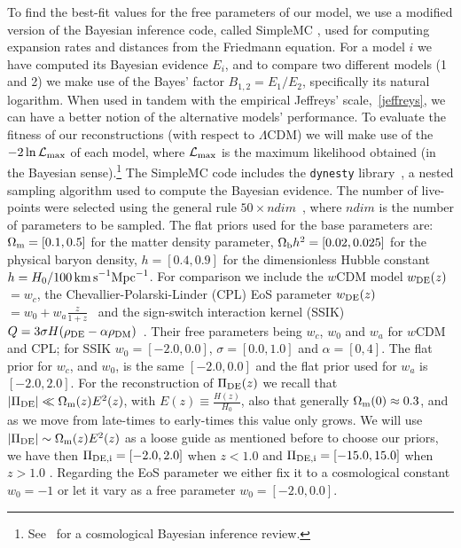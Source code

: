 \documentclass[twocolumn,a4paper,reprint,amssymb,aps,prd,groupedaddress,superscriptaddress,nofootinbib]{revtex4-2}
\newcommand{\wde}[1]{$w_{\rm DE}(z)$#1}
\begin{document}
To find the best-fit values for the free parameters of our model, we use a modified version of
the Bayesian inference code, called SimpleMC \cite{simplemc, aubourg2015cosmological}, used for
computing expansion rates
and distances from the Friedmann equation. For a model $i$ we have computed its Bayesian evidence $E_i$,
and to compare two different models (1 and 2) we make use of the Bayes' factor $B_{1,2} = E_1/E_2$,
specifically its natural logarithm. When used in tandem with the empirical Jeffreys' scale,~\cref{jeffreys},
we can have a better notion of the alternative models' performance. To evaluate the fitness of our
reconstructions (with respect to $\Lambda$CDM) we will make use of the $-2\ln \mathcal{L_{\rm max}}$
of each model, where $\mathcal{L_{\rm max}}$ is the maximum likelihood obtained (in the Bayesian sense).\footnote{See~\cite{Padilla:2019mgi} for a cosmological Bayesian inference review.}
The SimpleMC code includes the \texttt{dynesty} library~\cite{speagle2020dynesty},
a nested sampling algorithm used to compute the Bayesian evidence.  The number of live-points were
selected using the general rule $50 \times ndim$~\cite{dynestyy}, where $ndim$ is the number of parameters
to be sampled.
The flat priors used for the base parameters are: $\Omega_{\rm m} = [0.1, 0.5]$ for the matter
density parameter, $\Omega_{\rm b} h^2 = [0.02, 0.025]$ for the physical baryon density, $h = [0.4, 0.9]$
for the dimensionless Hubble constant $h=H_0/100\, {\rm km\,s}^{-1}{\rm Mpc}^{-1}$. For comparison we
include the $w$CDM model \wde{}$ = w_c$, the Chevallier-Polarski-Linder (CPL)
EoS parameter \wde{}$= w_0 + w_a\frac{z}{1+z}$~\cite{Chevallier} and the sign-switch interaction
kernel (SSIK) $Q=3\sigma H(\rho_{\rm DE}-\alpha\rho_{\rm DM})$~\cite{Sun:2010vz}. Their free parameters
being $w_c$, $w_0$ and $w_a$ for $w$CDM and CPL; for SSIK $w_0 = [-2.0, 0.0]$, $\sigma = [0.0, 1.0]$
and $\alpha= [0, 4]$.
%
The flat prior for $w_c$, and $w_0$, is the same $[-2.0,0.0]$ and the flat prior used for $w_a$ is
$[-2.0, 2.0]$. For the reconstruction of $\Pi_{\rm DE}(z)$ we recall that $|\Pi_{\rm DE} |
\ll \Omega_{\rm m}(z)E^2(z)$, with $E(z)\equiv \frac{H(z)}{H_0}$, also that generally $\Omega_{\rm m}(0)
\approx 0.3$, and as we move from late-times to early-times this value only grows.
We will use $|\Pi_{\rm DE}| \sim \Omega_{\rm m}(z)E^2(z)$ as a loose guide as mentioned before to choose our priors, we
have then $\Pi_{\rm DE,i} = [-2.0,2.0]$ when $z<1.0$ and $\Pi_{\rm DE,i} = [-15.0,15.0]$ when $z>1.0$ .
Regarding the EoS parameter we either fix it to a cosmological
constant $w_0 = -1$ or let it vary as a free parameter $w_0 = [-2.0, 0.0]$.
\end{document}
